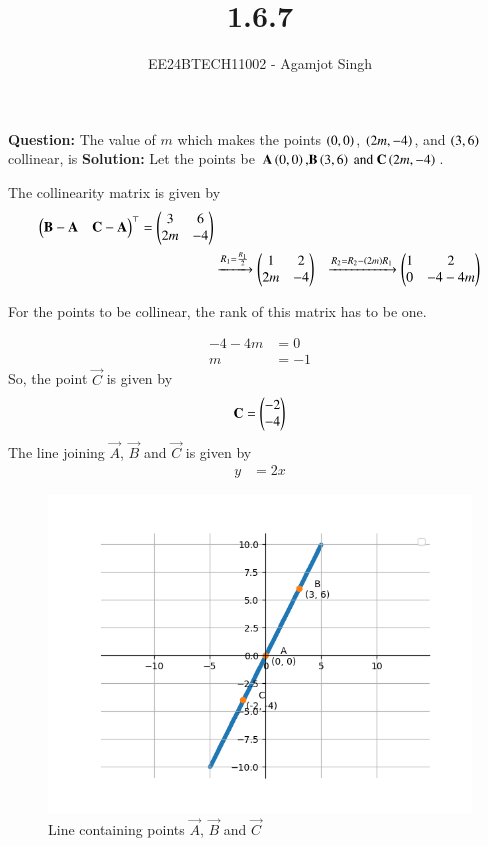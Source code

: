 \documentclass[journal]{IEEEtran}
\begin{document}

\vspace{3cm}

\title{1.6.7}
\author{EE24BTECH11002 - Agamjot Singh
}
{\let\newpage\relax\maketitle}

\renewcommand{\thefigure}{\theenumi}
\renewcommand{\thetable}{\theenumi}
\setlength{\intextsep}{10pt} %

\textbf{Question:}
\newline
The value of $m$ which makes the points $\left(0, 0\right)$, $\left(2m, -4\right)$, and $\left(3,6\right)$ collinear, is
\newline
\textbf{Solution:}
\newline
Let the points be $\mathbf{A}\left(0, 0\right) \text{,} \mathbf{B}\left(3, 6\right) \text{ and } \mathbf{C}\left(2m, -4\right)$.

The collinearity matrix is given by
\begin{align}
	\begin{pmatrix}\mathbf{B} - \mathbf{A} & \mathbf{C} - \mathbf{A}\end{pmatrix}^\top = \begin{pmatrix}3 & 6 \\ 2m & -4\end{pmatrix}\\ 
													   &\xrightarrow{R_1 = \frac{R_1}{2}} \begin{pmatrix}1 & 2\\2m & -4\end{pmatrix}
													   &\xrightarrow{R_2 = R_2 - \left(2m\right)R_1} \begin{pmatrix}1 & 2\\0 & -4-4m\end{pmatrix}
\end{align}

For the points to be collinear, the rank of this matrix has to be one.

\begin{align}
	-4-4m &= 0\\
	m &= -1
\end{align}
So, the point $\vec{C}$ is given by
\begin{align}
	\mathbf{C} = \begin{pmatrix}-2\\-4\end{pmatrix}
\end{align}
The line joining $\vec{A}$, $\vec{B}$ and $\vec{C}$ is given by 
\begin{align}
	y &= 2x
\end{align}

\begin{figure}[h!]
   \centering
   \includegraphics[width=0.7\linewidth]{figs/graph.png}
   \caption{Line containing points $\vec{A}$, $\vec{B}$ and $\vec{C}$}
\end{figure}
\end{document}
